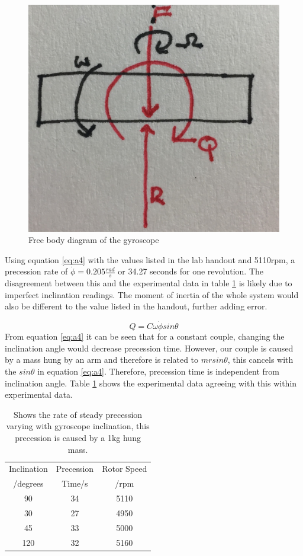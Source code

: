 \documentclass[twoside,twocolumn]{article}
\begin{document}
\begin{figure}[h]
  \centering
    \includegraphics[width=\linewidth]{force}
  \caption{Free body diagram of the gyroscope}
  \label{fig:fbd1}
\end{figure}


Using equation \ref{eq:a4} with the values listed in the lab handout and 5110rpm, a precession rate of $\dot{\phi} = 0.205\frac{rad}{s}$ or 34.27 seconds for one revolution. The disagreement between this and the experimental data in table \ref{table:1} is likely due to imperfect inclination readings. The moment of inertia of the whole system would also be different to the value listed in the handout, further adding error.
 
\begin{equation}
\label{eq:a4}
Q=C\omega\dot{\phi}sin\theta
\end{equation} 
\newline
From equation \ref{eq:a4} it can be seen that for a constant couple, changing the inclination angle would decrease precession time. However, our couple is caused by a mass hung by an arm and therefore is related to $mrsin\theta$, this cancels with the $sin\theta$ in equation \ref{eq:a4}. Therefore,  precession time is independent from inclination angle.  Table \ref{table:1} shows the experimental data agreeing with this within experimental data.

\begin{table}[h]
\caption{Shows the rate of steady precession varying with gyroscope inclination, this precession is caused by a 1kg hung mass.}
\centering
\begin{tabular}{ c | c | c }
Inclination & Precession & Rotor Speed \\
/degrees & Time/s & /rpm  \\
\midrule
90 & 34 & 5110  \\
30 & 27 & 4950 \\
45 & 33 & 5000 \\
120 & 32 & 5160 \\
\end{tabular}
\label{table:1}
\end{table}
\end{document}
